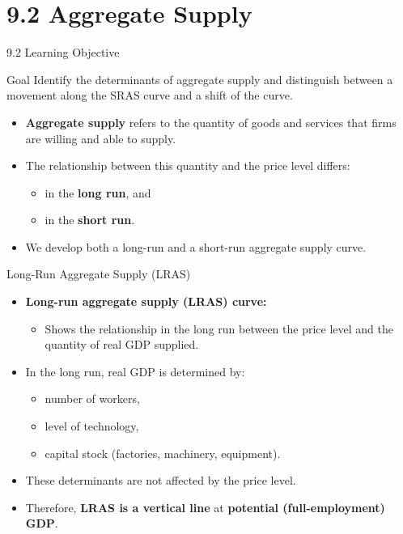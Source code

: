 \documentclass[aspectratio=169]{beamer}
\begin{document}
\section{9.2 Aggregate Supply}

\begin{frame}{9.2 Learning Objective}
\transfade
\begin{block}{Goal}
Identify the determinants of aggregate supply and distinguish between a movement along the SRAS curve and a shift of the curve.
\end{block}
\begin{itemize}
  \item \textbf{Aggregate supply} refers to the quantity of goods and services that firms are willing and able to supply.
  \item The relationship between this quantity and the price level differs:
  \begin{itemize}
    \item in the \textbf{long run}, and
    \item in the \textbf{short run}.
  \end{itemize}
  \item We develop both a long-run and a short-run aggregate supply curve.
\end{itemize}
\end{frame}

\begin{frame}{Long-Run Aggregate Supply (LRAS)}
\transfade
\begin{itemize}
  \item \textbf{Long-run aggregate supply (LRAS) curve:}
  \begin{itemize}
    \item Shows the relationship in the long run between the price level and the quantity of real GDP supplied.
  \end{itemize}
  \item In the long run, real GDP is determined by:
  \begin{itemize}
    \item number of workers,
    \item level of technology,
    \item capital stock (factories, machinery, equipment).
  \end{itemize}
  \item These determinants are not affected by the price level.
  \item Therefore, \textbf{LRAS is a vertical line} at \textbf{potential (full-employment) GDP}.
\end{itemize}
\end{frame}
\end{document}
